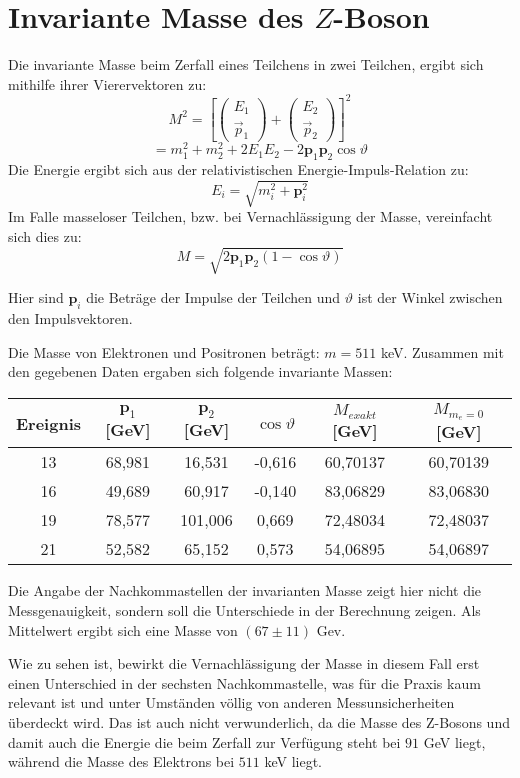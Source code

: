\section{Invariante Masse des $Z$-Boson}


Die invariante Masse beim Zerfall eines Teilchens in zwei Teilchen, ergibt sich mithilfe ihrer Vierervektoren zu:
\[
M^2 =\left[ \left( \begin{array}{c} E_1 \\ {\vec{p}_1} \end{array} \right) + \left( \begin{array}{c} E_2 \\ {\vec{p}_2} \end{array} \right) \right]^2
\]
\[
= m_1^2 + m_2^2 + 2 E_1 E_2 - 2 \textbf{p}_1 \textbf{p}_2 \cos \vartheta
\]
Die Energie ergibt sich aus der relativistischen Energie-Impuls-Relation zu:
\[
E_i = \sqrt{m_i^2 + \textbf{p}_i^2}
\]
Im Falle masseloser Teilchen, bzw. bei Vernachlässigung der Masse, vereinfacht sich dies zu:
\[
M = \sqrt{2 \textbf{p}_1 \textbf{p}_2 (1-\cos \vartheta)}
\]

Hier sind $ \textbf{p}_i$ die Beträge der Impulse der Teilchen und $\vartheta$ ist der Winkel zwischen den Impulsvektoren.

Die Masse von Elektronen und Positronen beträgt: $m=511$ keV.
Zusammen mit den gegebenen Daten ergaben sich folgende invariante Massen:
\begin{center}
\begin{tabular}{ c | c| c | c | c | c }
Ereignis & $ \textbf{p}_1$ [GeV] & $ \textbf{p}_2$ [GeV] & $ \cos \vartheta $ & $M_{exakt}$ [GeV] &$ M_{m_e = 0}$ [GeV] \\ 
\hline
13 & 68,981 & 16,531 & -0,616 & 60,70137 & 60,70139 \\ 
16 & 49,689 & 60,917 & -0,140 & 83,06829 & 83,06830 \\
19 & 78,577 & 101,006 & 0,669 &72,48034 & 72,48037 \\
21 & 52,582 & 65,152 & 0,573 & 54,06895 & 54,06897 \\
\end{tabular}
\end{center}
Die Angabe der Nachkommastellen der invarianten Masse zeigt hier nicht die Messgenauigkeit, sondern soll die Unterschiede in der Berechnung zeigen.
Als Mittelwert ergibt sich eine Masse von $(67 \pm 11)$ Gev.

Wie zu sehen ist, bewirkt die Vernachlässigung der Masse in diesem Fall erst einen Unterschied in der sechsten Nachkommastelle, was für die Praxis kaum relevant ist und unter Umständen völlig von anderen Messunsicherheiten überdeckt wird.
Das ist auch nicht verwunderlich, da die Masse des Z-Bosons und damit auch die Energie die beim Zerfall zur Verfügung steht bei $91$ GeV liegt, während die Masse des Elektrons bei $511$ keV liegt.

